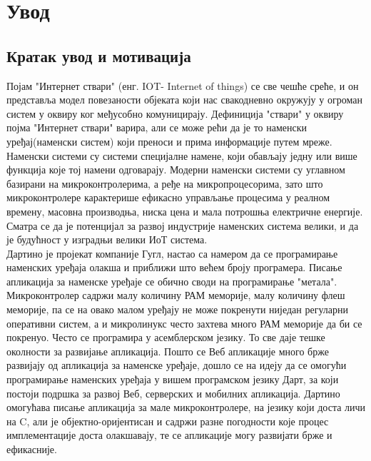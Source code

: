 \documentclass[12pt,oneside]{memoir}
\begin{document}
\frontmatter
\naslovna
\komisija
\apstrakt
\tableofcontents*

\mainmatter

\chapter{Увод}
\section{Кратак увод и мотивација}
Појам "Интернет ствари" (енг. IOT- Internet of things) се све чешће среће, и он представља модел повезаности објеката који нас свакодневно окружују у огроман систем у оквиру ког међусобно комуницирају. Дефиниција "ствари" у оквиру појма "Интернет ствари" варира, али се може рећи да је то наменски уређај(наменски систем) који преноси и прима информације путем мреже. Наменски системи су системи специјалне намене, који обављају једну или више функција које тој намени одговарају. Модерни наменски системи су углавном базирани на микроконтролерима, а ређе на микропроцесорима, зато што микроконтролере карактерише ефикасно управљање процесима у реалном времену, масовна производња, ниска цена и мала потрошња електричне енергије. Сматра се да је потенцијал за развој индустрије наменских система велики, и да је будућност у изградњи велики ИоТ система.\\

Дартино је пројекат компаније Гугл, настао са намером да се програмирање наменских уређаја олакша и приближи што већем броју програмера. Писање апликација за наменске уређаје се обично своди на програмирање "метала". Микроконтролер садржи малу количину РАМ меморије, малу количину флеш меморије, па се на овако малом уређају не може покренути ниједан регуларни оперативни систем, а и микролинукс често захтева много РАМ меморије да би се покренуо. Често се програмира у асемблерском језику. То све даје тешке околности за развијање апликација.
Пошто се Веб апликације много брже развијају од апликација за наменске уређаје, дошло се на идеју да се омогући програмирање наменских уређаја у вишем програмском језику Дарт, за који постоји подршка за развој Веб, серверских и мобилних апликација. Дартино омогућава писање апликација за мале микроконтролере, на језику који доста личи на C, али је објектно-оријентисан и садржи разне погодности које процес имплементације доста олакшавају, те се апликације могу развијати брже и ефикасније.\\
\end{document}
